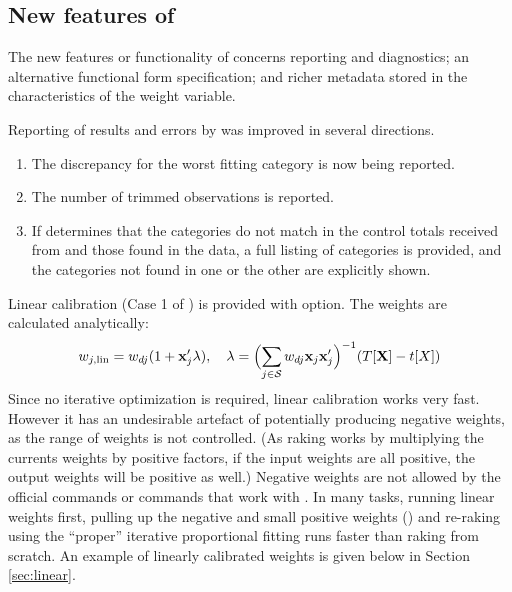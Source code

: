 \subsection{New features of }
\label{subsec:example:meta}

The new features or functionality of  concerns reporting and diagnostics;
an alternative functional form specification; and richer metadata stored in the characteristics
of the weight variable.

Reporting of results and errors by  was improved in several directions.
\begin{enumerate}
    \item The discrepancy for the worst fitting category is now being reported.
    \item The number of trimmed observations is reported.
    \item If  determines that the categories do not match
        in the control totals received from  and those found in
        the data, a full listing of categories is provided, and the categories
        not found in one or the other are explicitly shown.
\end{enumerate}

\begin{stlog}

\end{stlog}


Linear calibration (Case 1 of \citet{deville:sarndal:1992}) is provided with
 option. The weights are calculated analytically:
\begin{equation}
    \label{eq:linear:weight}
    w_{j,\rm{lin}} = w_{dj} (1+\mathbf{x}_j'\mathbf{\lambda}),
    \quad
    \mathbf{\lambda} = \Bigl( \sum_{j \in \mathcal{S}} w_{dj} \mathbf{x}_j \mathbf{x}_j' \Bigr)^{-1}
        ( T [ \mathbf{X}  ] - t[X] )
\end{equation}
Since no iterative optimization is required, linear calibration works very fast.
However it has an undesirable artefact of potentially producing negative weights,
as the range of weights is not controlled. (As raking works by multiplying the currents
weights by positive factors, if the input weights are all positive, the output weights
will be positive as well.) Negative weights are not allowed by the official  commands
or commands that work with \stcmd{[pweights]}.
In many tasks, running linear weights first,
pulling up the negative and small positive weights ()
and re-raking using the ``proper'' iterative proportional fitting runs faster than
raking from scratch. An example of linearly calibrated weights is given below
in Section \ref{sec:linear}.

